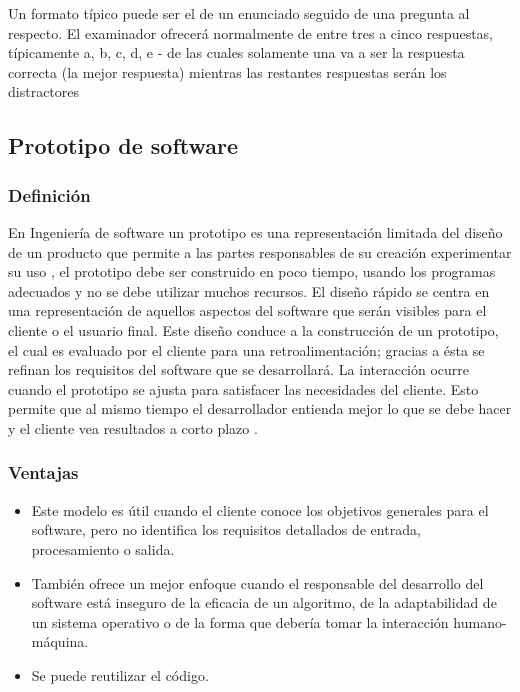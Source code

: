 Un formato típico puede ser el de un enunciado seguido de una pregunta al respecto. El examinador ofrecerá normalmente de entre tres a cinco respuestas, típicamente a, b, c, d, e - de las cuales solamente una va a ser la respuesta correcta (la mejor respuesta) mientras las restantes respuestas serán los distractores \citep{salkind}
\vskip 1cm 


\subsection{Prototipo de software}

\subsubsection{Definición}

En Ingeniería de software un prototipo es una representación limitada del diseño de un producto que permite a las partes responsables de su creación experimentar su uso \citep{pressman_troya}, el prototipo debe ser construido en poco tiempo, usando los programas adecuados y no se debe utilizar muchos recursos.
\vskip 0.3cm
El diseño rápido se centra en una representación de aquellos aspectos del software que serán visibles para el cliente o el usuario final. Este diseño conduce a la construcción de un prototipo, el cual es evaluado por el cliente para una retroalimentación; gracias a ésta se refinan los requisitos del software que se desarrollará. La interacción ocurre cuando el prototipo se ajusta para satisfacer las necesidades del cliente. Esto permite que al mismo tiempo el desarrollador entienda mejor lo que se debe hacer y el cliente vea resultados a corto plazo \citep{pressman_troya}.


\subsubsection{Ventajas}

\begin{itemize}
	\item Este modelo es útil cuando el cliente conoce los objetivos generales para el software, pero no identifica los requisitos detallados de entrada, procesamiento o salida.
	\item También ofrece un mejor enfoque cuando el responsable del desarrollo del software está inseguro de la eficacia de un algoritmo, de la adaptabilidad de un sistema operativo o de la forma que debería tomar la interacción humano-máquina.
	\item Se puede reutilizar el código.
\end{itemize}


